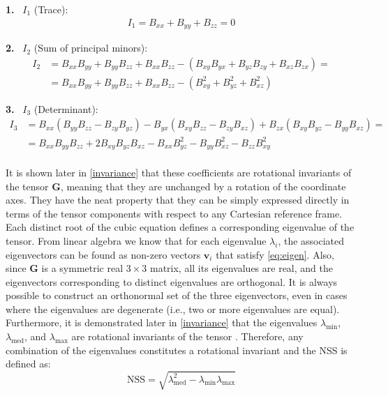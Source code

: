 \noindent
\textbf{1.} \, \( I_1 \) (Trace):
\begin{align*}
    I_1 = B_{xx} + B_{yy} + B_{zz} = 0
\end{align*}

\noindent
\textbf{2.} \, \( I_2 \) (Sum of principal minors):
\begin{align*}
    I_2 &= B_{xx}B_{yy} + B_{yy}B_{zz} + B_{xx}B_{zz} 
        - (B_{xy}B_{yx} + B_{yz}B_{zy} + B_{xz}B_{zx}) = \\
        &= B_{xx}B_{yy} + B_{yy}B_{zz} + B_{xx}B_{zz} 
         - (B_{xy}^2 + B_{yz}^2 + B_{xz}^2)
\end{align*}

\noindent
\textbf{3.} \, \( I_3 \) (Determinant):
\begin{align*}
    I_3 &= B_{xx} (B_{yy} B_{zz} - B_{zy} B_{yz}) 
    - B_{yx} (B_{xy} B_{zz} - B_{zy} B_{xz}) 
    + B_{zx} (B_{xy} B_{yz} - B_{yy} B_{xz}) = \\
        &= B_{xx}B_{yy}B_{zz} + 2B_{xy}B_{yz}B_{xz} - 
        B_{xx}B_{yz}^2 - B_{yy}B_{xz}^2 - B_{zz}B_{xy}^2
\end{align*}
\\
It is shown later in \ref{invariance} that these coefficients are rotational invariants of 
the tensor \( \mathbf{G} \), meaning that they are unchanged by a 
rotation of the coordinate axes. They have the neat property that they can be simply expressed
directly in terms of the tensor components with respect to any
Cartesian reference frame.
Each distinct root of the cubic equation defines a corresponding 
eigenvalue of the tensor. From linear algebra we know that for each eigenvalue \( \lambda_i \), the 
associated eigenvectors can be found as non-zero vectors 
\( \mathbf{v}_i \) that satisfy \ref{eq:eigen}.
Also, since \( \mathbf{G} \) is a symmetric real \( 3 \times 3 \) matrix, 
all its eigenvalues are real, and the eigenvectors corresponding to 
distinct eigenvalues are orthogonal. It is always possible to construct 
an orthonormal set of the three eigenvectors, even in cases where the 
eigenvalues are degenerate (i.e., two or more eigenvalues are equal).
Furthermore, it is demonstrated later in \ref{invariance} that the eigenvalues \( \lambda_{\text{min}} \), 
\( \lambda_{\text{med}} \), and \( \lambda_{\text{max}} \) are rotational 
invariants of the tensor \cite{NSS_single_different_dimensions}.
Therefore, any combination of the eigenvalues 
constitutes a rotational invariant and the NSS is defined as:
\begin{equation}
\text{NSS} = \sqrt{\lambda_{\text{med}}^2 - \lambda_{\text{min}} \lambda_{\text{max}}}
\label{eq:NSS}
\end{equation}
